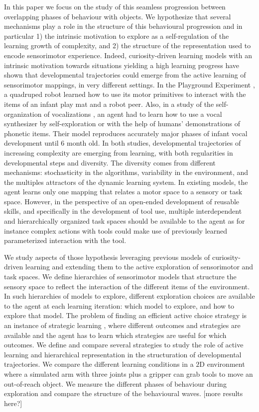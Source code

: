 \documentclass[10pt,letterpaper]{article}
\begin{document}
	In this paper we focus on the study of this seamless progression between overlapping phases of behaviour with objects.	
	We hypothesize that several mechanisms play a role in the structure of this behavioural progression and in particular 
	1) the intrinsic motivation to explore as a self-regulation of the learning growth of complexity, and 
	2) the structure of the representation used to encode sensorimotor experience.	
	Indeed, curiosity-driven learning models with an intrinsic motivation towards situations yielding a high learning progress 
	have shown that developmental trajectories could emerge from the active learning of sensorimotor mappings, in very different settings.
	In the Playground Experiment \cite{oudeyer_what_2007}, a quadruped robot learned how to use its motor primitives to interact with the items of an infant play mat and a robot peer.
	Also, in a study of the self-organization of vocalizations \cite{moulin-frier_self-organization_2014}, an agent had to learn how to
	use a vocal synthesizer by self-exploration or with the help of humans' demonstrations of phonetic items. 
	Their model reproduces accurately major phases of infant vocal development until $6$ month old.
	In both studies, developmental trajectories of increasing complexity are emerging from learning, with both regularities in developmental steps and diversity.
	The diversity comes from different mechanisms: stochasticity in the algorithms, variability in the environment, and the multiples attractors of the dynamic learning system.
	In existing models, the agent learns only one mapping that relates a motor space to a sensory or task space. 
	However, in the perspective of an open-ended development of reusable skills, and specifically in the development of tool use, multiple interdependent and hierarchically organized task spaces should be available to the agent
	as for instance complex actions with tools could make use of previously learned parameterized interaction with the tool.
	
	We study aspects of those hypothesis leveraging previous models of curiosity-driven learning and extending them to the active exploration of sensorimotor and task spaces.
	We define hierarchies of sensorimotor models that structure the sensory space to reflect the interaction of the different items of the environment.
	In such hierarchies of models to explore, different exploration choices are available to the agent at each learning iteration: which model to explore, and how to explore that model.
	The problem of finding an efficient active choice strategy is an instance of strategic learning \cite{nguyen2012}, 
	where different outcomes and strategies are available and the agent has to learn which strategies are useful for which outcomes. 
	We define and compare several strategies to study the role of active learning and hierarchical representation in the structuration of developmental trajectories.
	We compare the different learning conditions in a $2$D environment where a simulated arm with three joints plus a gripper can grab tools to move an out-of-reach object.
	We measure the different phases of behaviour during exploration and compare the structure of the behavioural waves. [more results here?]
	
\end{document}
